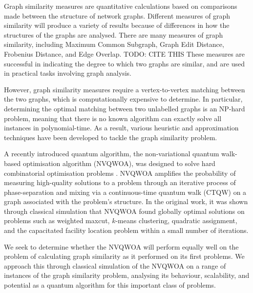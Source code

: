 Graph similarity measures are quantitative calculations based on comparisons made between the structure of network graphs. Different measures of graph similarity will produce a variety of results because of differences in how the structures of the graphs are analysed. There are many measures of graph similarity, including Maximum Common Subgraph, Graph Edit Distance, Frobenius Distance, and Edge Overlap. TODO: CITE THIS  These measures are successful in indicating the degree to which two graphs are similar, and are used in practical tasks involving graph analysis.

However, graph similarity measures require a vertex-to-vertex matching between the two graphs, which is computationally expensive to determine. In particular, determining the optimal matching between two unlabelled graphs is an NP-hard problem, meaning that there is no known algorithm can exactly solve all instances in polynomial-time. As a result, various heuristic and approximation techniques have been developed to tackle the graph similarity problem.

A recently introduced quantum algorithm, the non-variational quantum walk-based optimisation algorithm (NVQWOA), was designed to solve hard combinatorial optimisation problems \cite{bennett2024nonvariational,bennett2024analysisnonvariationalquantumwalkbased}. NVQWOA amplifies the probability of measuring high-quality solutions to a problem through an iterative process of phase-separation and mixing via a continuous-time quantum walk (CTQW) on a graph associated with the problem's structure. In the original work, it was shown through classical simulation that NVQWOA found globally optimal solutions on problems such as weighted maxcut, $k$-means clustering, quadratic assignment, and the capacitated facility location problem within a small number of iterations.

We seek to determine whether the NVQWOA will perform equally well on the problem of calculating graph similarity as it performed on its first problems. We approach this through classical simulation of the NVQWOA on a range of instances of the graph similarity problem, analysing its behaviour, scalability, and potential as a quantum algorithm for this important class of problems.

